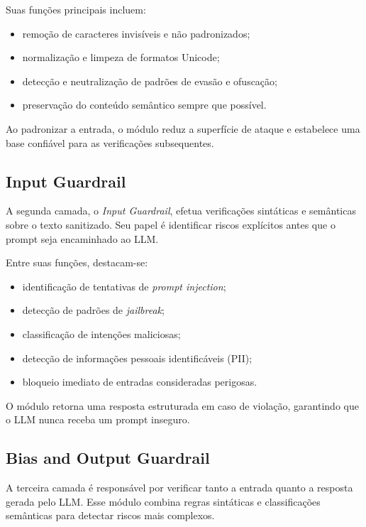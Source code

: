Suas funções principais incluem:

\begin{itemize}
    \item remoção de caracteres invisíveis e não padronizados;
    \item normalização e limpeza de formatos Unicode;
    \item detecção e neutralização de padrões de evasão e ofuscação;
    \item preservação do conteúdo semântico sempre que possível.
\end{itemize}

Ao padronizar a entrada, o módulo reduz a superfície de ataque e estabelece uma base confiável para as verificações subsequentes.

\subsection{Input Guardrail}

A segunda camada, o \textit{Input Guardrail}, efetua verificações sintáticas e semânticas sobre o texto sanitizado. Seu papel é identificar riscos explícitos antes que o prompt seja encaminhado ao LLM.

Entre suas funções, destacam-se:

\begin{itemize}
    \item identificação de tentativas de \textit{prompt injection};
    \item detecção de padrões de \textit{jailbreak};
    \item classificação de intenções maliciosas;
    \item detecção de informações pessoais identificáveis (PII);
    \item bloqueio imediato de entradas consideradas perigosas.
\end{itemize}

O módulo retorna uma resposta estruturada em caso de violação, garantindo que o LLM nunca receba um prompt inseguro.

\subsection{Bias and Output Guardrail}

A terceira camada é responsável por verificar tanto a entrada quanto a resposta gerada pelo LLM. Esse módulo combina regras sintáticas e classificações semânticas para detectar riscos mais complexos.

